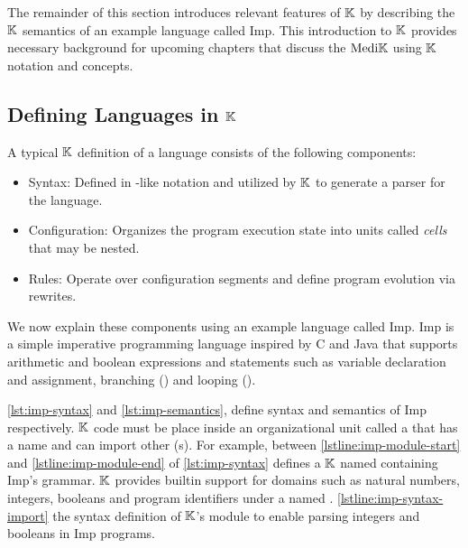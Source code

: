The remainder of this section introduces relevant features of
$\mathbb{K}{}$ by describing the $\mathbb{K}{}$ semantics of an example language called
Imp. This introduction to $\mathbb{K}{}$ provides necessary background
for upcoming chapters that discuss the $\text{Medi}\mathbb{K}{}{}$ \DSL{} using $\mathbb{K}{}$ notation and concepts.

\subsection{Defining Languages in $\mathbb{K}$}\label{sec:semantics-in-k}

A typical $\mathbb{K}$ definition of a language consists of the following components:
\begin{itemize}
  \item Syntax: Defined in \BNF{}-like notation and utilized by $\mathbb{K}$
    to generate a parser for the language.
  \item Configuration: Organizes the program execution state
    into units called \emph{cells} that may be nested.
  \item Rules: Operate over configuration segments and define program
    evolution via rewrites.
\end{itemize}
We now explain these components using an example language called
Imp. Imp is a simple imperative programming language
inspired by C and Java that supports arithmetic and boolean expressions and
statements such as variable declaration and assignment, branching ()
and looping ().

\autoref{lst:imp-syntax} and \autoref{lst:imp-semantics},
define syntax and semantics of Imp respectively.
$\mathbb{K}{}$ code must be place inside an organizational unit called a
 that has a name and can import other (s).
For example, 
between \autoref{lstline:imp-module-start} and
\autoref{lstline:imp-module-end} of \autoref{lst:imp-syntax} defines
a $\mathbb{K}{}$  named  containing Imp's
grammar. $\mathbb{K}{}$ provides builtin support for domains such as natural
numbers, integers, booleans and program identifiers
under a  named .
\autoref{lstline:imp-syntax-import} 
the syntax definition of $\mathbb{K}{}$'s  module
to enable parsing integers and booleans in Imp programs.

